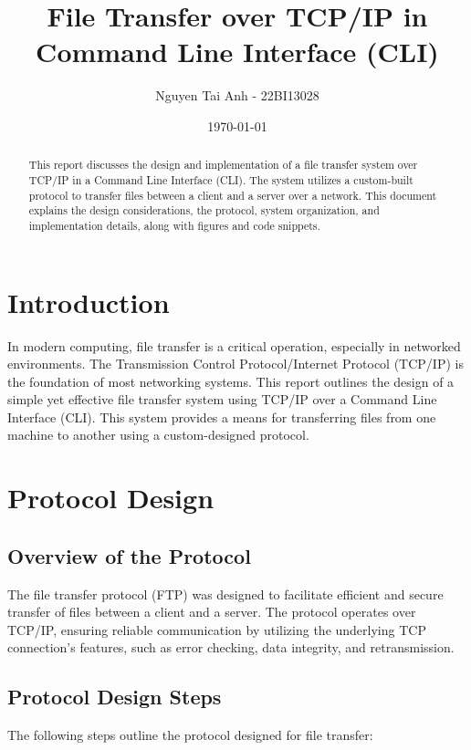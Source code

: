 \documentclass[a4paper,12pt]{article}
\title{File Transfer over TCP/IP in Command Line Interface (CLI)}
\author{Nguyen Tai Anh - 22BI13028}
\date{\today}
\begin{document}
\maketitle

\tableofcontents  %

\begin{abstract}
This report discusses the design and implementation of a file transfer system over TCP/IP in a Command Line Interface (CLI). The system utilizes a custom-built protocol to transfer files between a client and a server over a network. This document explains the design considerations, the protocol, system organization, and implementation details, along with figures and code snippets.
\end{abstract}

\section{Introduction}
In modern computing, file transfer is a critical operation, especially in networked environments. The Transmission Control Protocol/Internet Protocol (TCP/IP) is the foundation of most networking systems. This report outlines the design of a simple yet effective file transfer system using TCP/IP over a Command Line Interface (CLI). This system provides a means for transferring files from one machine to another using a custom-designed protocol.

\section{Protocol Design}
\subsection{Overview of the Protocol}
The file transfer protocol (FTP) was designed to facilitate efficient and secure transfer of files between a client and a server. The protocol operates over TCP/IP, ensuring reliable communication by utilizing the underlying TCP connection’s features, such as error checking, data integrity, and retransmission. 

\subsection{Protocol Design Steps}
The following steps outline the protocol designed for file transfer:
\end{document}
